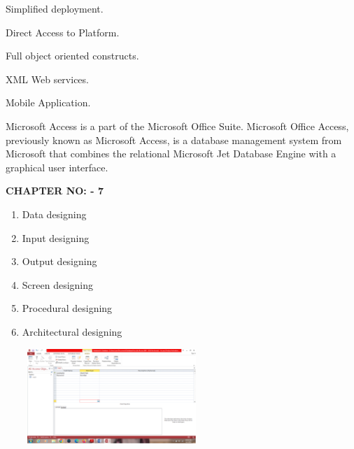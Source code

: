 \documentclass{article} %
\begin{document}
 Simplified deployment. 

 Direct Access to Platform. 

 Full object oriented constructs. 

 XML Web services. 

 Mobile Application. 

\noindent 

\noindent \textbf{}\underbar{}

\noindent         Microsoft Access is a part of the Microsoft Office Suite. Microsoft Office Access, previously known as Microsoft Access, is a database management system from Microsoft that combines the relational Microsoft Jet Database Engine with a graphical user interface.

\noindent 

\noindent 

\noindent 

\noindent 

\noindent 

\noindent 

\noindent \textbf{                                                 CHAPTER NO: - 7 }

\noindent \textbf{                }

\noindent 

\begin{enumerate}
\item  Data designing 

\item  Input designing 

\item  Output designing 

\item  Screen designing 

\item  Procedural designing 

\item  Architectural designing 
\end{enumerate}

\noindent 

\noindent \textbf{}

\noindent \textbf{\underbar{}}

\noindent \includegraphics*[width=3.16in, height=1.41in, keepaspectratio=false, trim=1.50in 5.84in 5.16in 1.64in]{image2}\underbar{}
\end{document}
